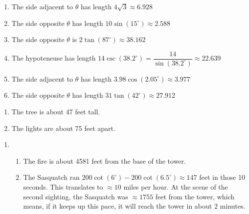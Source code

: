 \begin{enumerate}

\setcounter{enumi}{\value{HW}}

\item  The side adjacent to $\theta$ has length $4\sqrt{3} \approx 6.928$

\item  The side opposite $\theta$ has length $10 \sin(15^{\circ}) \approx 2.588$

\item  The side opposite $\theta$ is $2\tan(87^{\circ}) \approx 38.162$

\item  The hypoteneuse has length $14 \csc(38.2^{\circ}) = \dfrac{14}{\sin(38.2^{\circ})} \approx 22.639$

\item  The side adjacent to $\theta$ has length $3.98 \cos(2.05^{\circ}) \approx 3.977$

\item  The side opposite $\theta$ has length $31\tan(42^{\circ}) \approx 27.912$

\setcounter{HW}{\value{enumi}}

\end{enumerate}

\begin{enumerate}

\setcounter{enumi}{\value{HW}}

\item The tree is about 47 feet tall.

\item The lights are about 75 feet apart.

\setcounter{HW}{\value{enumi}}

\end{enumerate}

\begin{enumerate}

\setcounter{enumi}{\value{HW}}

\item \begin{enumerate}

\addtocounter{enumii}{1}

\item The fire is about 4581 feet from the base of the tower.

\item  The Sasquatch ran $200\cot(6^{\circ}) - 200\cot(6.5^{\circ}) \approx 147$ feet in those 10 seconds. This translates to $\approx 10$ miles per hour.  At the scene of the second sighting, the Sasquatch was $\approx 1755$ feet from the tower, which means, if it keeps up this pace, it will reach the tower in about $2$ minutes.

\end{enumerate}

\setcounter{HW}{\value{enumi}}

\end{enumerate}


